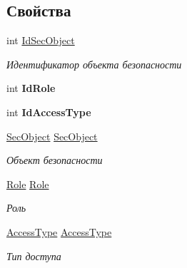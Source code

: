 \subsection*{Свойства}
\begin{DoxyCompactItemize}
\item 
int \hyperlink{class_security_1_1_model_1_1_grant_a7aa23fa7e6b9fc26527b9475e49c00d6}{Id\+Sec\+Object}
\begin{DoxyCompactList}\small\item\em Идентификатор объекта безопасности \end{DoxyCompactList}\item 
\mbox{\label{class_security_1_1_model_1_1_grant_aee8696c07cb90692e21caf7f3aaea9f2}} 
int {\bfseries Id\+Role}
\item 
\mbox{\label{class_security_1_1_model_1_1_grant_aa9d1376291dc83ad9f1e2ebfecf59d3f}} 
int {\bfseries Id\+Access\+Type}
\item 
\hyperlink{class_security_1_1_model_1_1_sec_object}{Sec\+Object} \hyperlink{class_security_1_1_model_1_1_grant_a85da2537c795eff5c994fa095e6b6706}{Sec\+Object}
\begin{DoxyCompactList}\small\item\em Объект безопасности \end{DoxyCompactList}\item 
\hyperlink{class_security_1_1_model_1_1_role}{Role} \hyperlink{class_security_1_1_model_1_1_grant_afa175ae2585ec7ed6c9da8552a8ac2d2}{Role}
\begin{DoxyCompactList}\small\item\em Роль \end{DoxyCompactList}\item 
\hyperlink{class_security_1_1_model_1_1_access_type}{Access\+Type} \hyperlink{class_security_1_1_model_1_1_grant_a03a20c89207a4db87455b93f6935916a}{Access\+Type}
\begin{DoxyCompactList}\small\item\em Тип доступа \end{DoxyCompactList}\end{DoxyCompactItemize}


